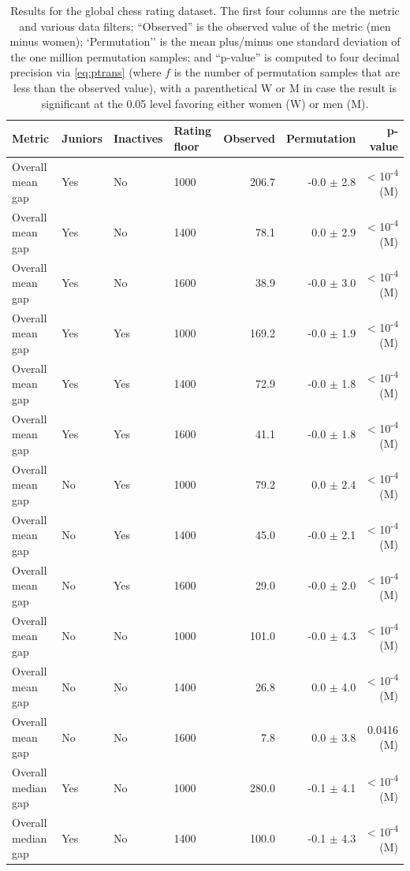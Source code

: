 \documentclass[9pt,twoside,lineno]{pnas-new}
\begin{document}
\begin{table}
\caption{\label{tab:global-perm-SI}Results for the global chess rating dataset. The first four columns are the metric and various data filters; ``Observed'' is the observed value of the metric (men minus women); `Permutation'' is the mean plus/minus one standard deviation of the one million permutation samples; and ``p-value'' is computed to four decimal precision via \eqref{eq:ptrans} (where $f$ is the number of permutation samples that are less than the observed value), with a parenthetical W or M in case the result is significant at the 0.05 level favoring either women (W) or men (M).}
\centering
\begin{tabular}[t]{llllrrr}
\toprule
Metric & Juniors & Inactives & Rating floor & Observed & Permutation & p-value\\
\midrule
Overall mean gap & Yes & No & 1000 & 206.7 & -0.0 $\pm$ 2.8 & < 10\textsuperscript{-4} (M)\\
Overall mean gap & Yes & No & 1400 & 78.1 & 0.0 $\pm$ 2.9 & < 10\textsuperscript{-4} (M)\\
Overall mean gap & Yes & No & 1600 & 38.9 & -0.0 $\pm$ 3.0 & < 10\textsuperscript{-4} (M)\\
Overall mean gap & Yes & Yes & 1000 & 169.2 & -0.0 $\pm$ 1.9 & < 10\textsuperscript{-4} (M)\\
Overall mean gap & Yes & Yes & 1400 & 72.9 & -0.0 $\pm$ 1.8 & < 10\textsuperscript{-4} (M)\\
Overall mean gap & Yes & Yes & 1600 & 41.1 & -0.0 $\pm$ 1.8 & < 10\textsuperscript{-4} (M)\\
Overall mean gap & No & Yes & 1000 & 79.2 & 0.0 $\pm$ 2.4 & < 10\textsuperscript{-4} (M)\\
Overall mean gap & No & Yes & 1400 & 45.0 & -0.0 $\pm$ 2.1 & < 10\textsuperscript{-4} (M)\\
Overall mean gap & No & Yes & 1600 & 29.0 & -0.0 $\pm$ 2.0 & < 10\textsuperscript{-4} (M)\\
Overall mean gap & No & No & 1000 & 101.0 & -0.0 $\pm$ 4.3 & < 10\textsuperscript{-4} (M)\\
Overall mean gap & No & No & 1400 & 26.8 & 0.0 $\pm$ 4.0 & < 10\textsuperscript{-4} (M)\\
Overall mean gap & No & No & 1600 & 7.8 & 0.0 $\pm$ 3.8 & 0.0416 (M)\\
\addlinespace
Overall median gap & Yes & No & 1000 & 280.0 & -0.1 $\pm$ 4.1 & < 10\textsuperscript{-4} (M)\\
Overall median gap & Yes & No & 1400 & 100.0 & -0.1 $\pm$ 4.3 & < 10\textsuperscript{-4} (M)\\

\end{tabular}
\end{table}
\end{document}
